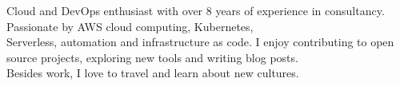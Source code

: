 

\begin{cvparagraph}

Cloud and DevOps enthusiast with over 8 years of experience in consultancy.
Passionate by AWS cloud computing, Kubernetes,\\ Serverless, automation and infrastructure as code. 
I enjoy contributing to open source projects, exploring new tools and writing blog posts.\\
Besides work, I love to travel and learn about new cultures. 
\end{cvparagraph}
